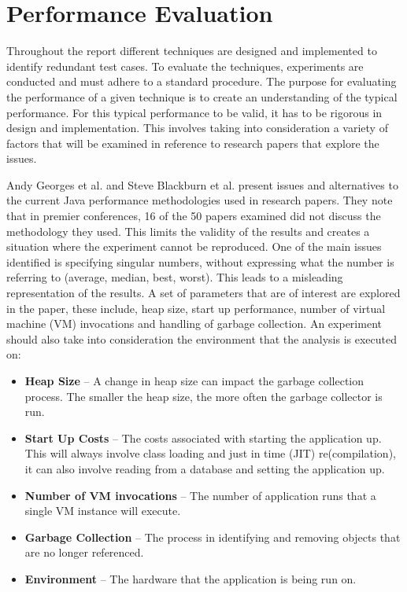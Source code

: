 \section{Performance Evaluation}
\label{performanceEvalBG}
Throughout the report different techniques are designed and implemented to identify redundant test cases. To evaluate the techniques, experiments are conducted and must adhere to a standard procedure. The purpose for evaluating the performance of a given technique is to create an understanding of the typical performance. For this typical performance to be valid, it has to be rigorous in design and implementation. This involves taking into consideration a variety of factors that will be examined in reference to research papers that explore the issues.

Andy Georges et al. \cite{georges2007statistically} and Steve Blackburn et al. \cite{blackburn2008wake} present issues and alternatives to the current Java performance methodologies used in research papers. They note that in premier conferences, 16 of the 50 papers examined did not discuss the methodology they used. This limits the validity of the results and creates a situation where the experiment cannot be reproduced. One of the main issues identified is specifying singular numbers, without expressing what the number is referring to (average, median, best, worst). This leads to a misleading representation of the results. A set of parameters that are of interest are explored in the paper, these include, heap size, start up performance, number of virtual machine (VM) invocations and handling of garbage collection. An experiment should also take into consideration the environment that the analysis is executed on:
\begin{itemize}
\item \textbf{Heap Size} -- A change in heap size can impact the garbage collection process. The smaller the heap size, the more often the garbage collector is run.
\item \textbf{Start Up Costs}  -- The costs associated with starting the application up. This will always involve class loading and just in time (JIT) re(compilation), it can also involve reading from a database and setting the application up.
\item \textbf{Number of VM invocations} -- The number of application runs that a single VM instance will execute.
\item \textbf{Garbage Collection} -- The process in identifying and removing objects that are no longer referenced.
\item \textbf{Environment} -- The hardware that the application is being run on.
\end{itemize}

